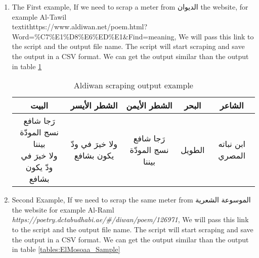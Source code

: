 \begin{enumerate}
\item The First example, If we need to scrap a meter from \textarabic{الديوان} the website, for example Al-Tawil \\textit{https://www.aldiwan.net/poem.html?Word=\%C7\%E1\%D8\%E6\%ED\%E1\&Find=meaning}, We will pass this link to the script and the output file name. The script will start scraping and save the output in a CSV format. We can get the output similar than the output in table \ref{tables:Aldiwan_Sample}


\begin{table}[H]
	\centering
	\begin{tabular}{c c c c c}
		\toprule
          \textbf{\small{\textarabic{البيت}}} & \small{\textbf{\textarabic{الشطر الأيسر}}} & \small{\textbf{\textarabic{الشطر الأيمن}}} &
\small{\textbf{\textarabic{البحر}}} & \small{\textbf{\textarabic{الشاعر}}} \\
          \midrule
\makecell{\textarabic{رَجا شافع نسج المودّة بيننا}\\ \textarabic{ولا خيرَ في ودّ يكون بشافع}} &
\textarabic{ولا خيرَ في ودّ يكون بشافع} &                                                       \textarabic{رَجا شافع نسج المودّة بيننا} &                                                       \textarabic{الطويل}&
\textarabic{ابن نباته المصري}\\
          
		\bottomrule
	\end{tabular}
	\caption{Aldiwan scraping output example }\label{tables:Aldiwan_Sample}
\end{table}

\item Second Example, If we need to scrap the same meter from \textarabic{الموسوعة الشعرية} the website for example Al-Raml \textit{https://poetry.dctabudhabi.ae/\#/diwan/poem/126971}, We will pass this link to the script and the output file name. The script will start scraping and save the output in a CSV format. We can get the output similar than the output in table \ref{tables:ElMosoaa_Sample}



\end{enumerate}
